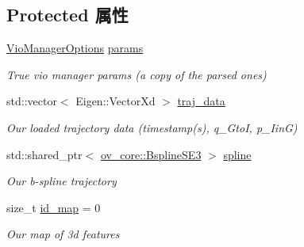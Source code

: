 \subsection*{Protected 属性}
\begin{DoxyCompactItemize}
\item 
\mbox{\label{classov__msckf_1_1Simulator_aaf26d06a73b0773018df69382dc2b3bc}} 
\hyperlink{structov__msckf_1_1VioManagerOptions}{Vio\+Manager\+Options} \hyperlink{classov__msckf_1_1Simulator_aaf26d06a73b0773018df69382dc2b3bc}{params}
\begin{DoxyCompactList}\small\item\em True vio manager params (a copy of the parsed ones) \end{DoxyCompactList}\item 
\mbox{\label{classov__msckf_1_1Simulator_af1e667cafe40b3f648ebd773153de72e}} 
std\+::vector$<$ Eigen\+::\+Vector\+Xd $>$ \hyperlink{classov__msckf_1_1Simulator_af1e667cafe40b3f648ebd773153de72e}{traj\+\_\+data}
\begin{DoxyCompactList}\small\item\em Our loaded trajectory data (timestamp(s), q\+\_\+\+GtoI, p\+\_\+\+IinG) \end{DoxyCompactList}\item 
\mbox{\label{classov__msckf_1_1Simulator_a4dd11bf8b7d9df46ea335ef7fa10271e}} 
std\+::shared\+\_\+ptr$<$ \hyperlink{classov__core_1_1BsplineSE3}{ov\+\_\+core\+::\+Bspline\+S\+E3} $>$ \hyperlink{classov__msckf_1_1Simulator_a4dd11bf8b7d9df46ea335ef7fa10271e}{spline}
\begin{DoxyCompactList}\small\item\em Our b-\/spline trajectory \end{DoxyCompactList}\item 
\mbox{\label{classov__msckf_1_1Simulator_a125ad6c49a2f30934a1b233534fbfb27}} 
size\+\_\+t \hyperlink{classov__msckf_1_1Simulator_a125ad6c49a2f30934a1b233534fbfb27}{id\+\_\+map} = 0
\begin{DoxyCompactList}\small\item\em Our map of 3d features \end{DoxyCompactList}\item 
\mbox{\label{classov__msckf_1_1Simulator_a51326add48004cb3c178d1a18ec7bd93}} 

\end{DoxyCompactItemize}
